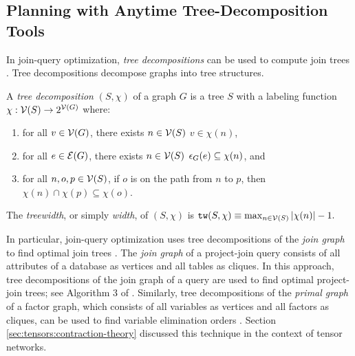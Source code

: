 \subsection{Planning with Anytime Tree-Decomposition Tools}
\label{sec_td}

In join-query optimization, \emph{tree decompositions} can be used to compute join trees \cite{DKV02,MPPV04}.
Tree decompositions \cite{RS91} decompose graphs into tree structures.
\begin{definition}
	A \emph{tree decomposition} $(S, \chi)$ of a graph $G$ is a tree $S$ with a labeling function $\chi : \mathcal{V}(S) \to 2^{\mathcal{V}(G)}$ where:
	\begin{enumerate}[ref=\arabic*]
		\item for all $v \in \mathcal{V}(G)$, there exists $n \in \mathcal{V}(S)$ \st{} $v \in \chi(n)$,
		\item for all $e \in \mathcal{E}(G)$, there exists $n \in \mathcal{V}(S)$ \st{} $\epsilon_{G}(e) \subseteq \chi(n)$, and
		\item for all $n, o, p \in \mathcal{V}(S)$, if $o$ is on the path from $n$ to $p$, then $\chi(n) \cap \chi(p) \subseteq \chi(o)$. \label{prop_running_intersection}
	\end{enumerate}
	The \emph{treewidth}, or simply \emph{width}, of $(S, \chi)$ is $\texttt{\upshape tw}(S, \chi) \equiv \max_{n \in \mathcal{V}(S)} \left| \chi(n) \right| - 1.$
\end{definition}

In particular, join-query optimization uses tree decompositions of the \emph{join graph} to find optimal join trees \cite{DKV02,MPPV04}.
The \emph{join graph} of a project-join query consists of all attributes of a database as vertices and all tables as cliques.
In this approach, tree decompositions of the join graph of a query are used to find optimal project-join trees; see Algorithm 3 of \cite{MPPV04}.
Similarly, tree decompositions of the \emph{primal graph} of a factor graph, which consists of all variables as vertices and all factors as cliques, can be used to find variable elimination orders \cite{KDLD05}.
Section \ref{sec:tensors:contraction-theory} discussed this technique in the context of tensor networks.

